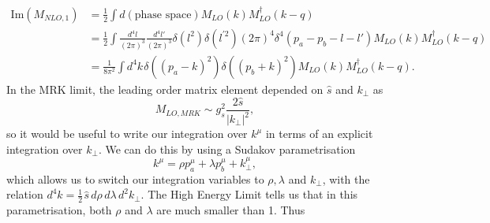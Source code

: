 \begin{equation}
\begin{split}
\text{Im}(M_{NLO,1}) &= \frac{1}{2} \int d(\text{phase space}) M_{LO}(k) M_{LO}^\dagger (k - q) \\
&= \frac{1}{2} \int \frac{d^4 l}{(2 \pi)^3} \frac{d^4 l'}{(2 \pi)^3} \delta(l^2) \delta(l^{'2}) (2 \pi)^4 \delta^4(p_a - p_b - l -l')  M_{LO}(k) M_{LO}^\dagger (k - q) \\
&= \frac{1}{8 \pi^2} \int d^4 k \hspace{1pt} \delta((p_a - k)^2) \delta((p_b+k)^2) M_{LO}(k) M_{LO}^\dagger (k - q).
\end{split}
\end{equation}
In the MRK limit, the leading order matrix element depended on $\hat{s}$ and $k_\perp$ as
\begin{equation}
M_{LO, MRK} \sim g_s^2 \frac{2 \hat{s}}{|k_\perp|^2},
\end{equation}
so it would be useful to write our integration over $k^\mu$ in terms of an explicit integration over $k_\perp$. We can do this by using a Sudakov parametrisation
\begin{equation}
k^\mu = \rho p_a^\mu + \lambda p_b ^\mu + k_\perp^\mu,
\end{equation}
which allows us to switch our integration variables to $\rho, \lambda$ and $k_\perp$, with the relation $d^4k = \frac{1}{2} \hspace{1pt} \hat{s} \hspace{2pt} d \rho \hspace{2pt} d \lambda \hspace{2pt} d^2 k_\perp$. The High Energy Limit tells us that in this parametrisation, both $\rho$ and $\lambda$ are much smaller than 1. Thus
